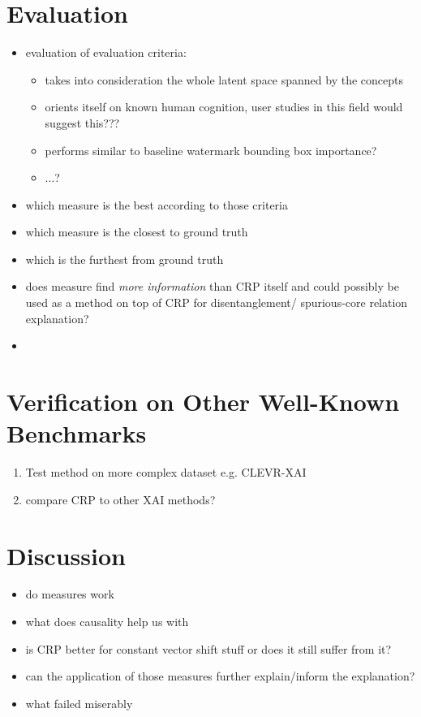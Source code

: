 \section{Evaluation}
\begin{itemize}
    \item evaluation of evaluation criteria:
    \begin{itemize}
        \item takes into consideration the whole latent space spanned by the concepts
        \item orients itself on known human cognition, user studies in this field would suggest this??? 
        \item performs similar to baseline watermark bounding box importance? 
        \item ...? 
    \end{itemize}
    \item which measure is the best according to those criteria
    \item which measure is the closest to ground truth
    \item which is the furthest from ground truth
    \item does measure find \textit{more information} than CRP itself and could possibly be used as a method on top of CRP for disentanglement/ spurious-core relation explanation?
    \item 
\end{itemize}

\section{Verification on Other Well-Known Benchmarks}
\begin{enumerate}
    \item Test method on more complex dataset e.g. CLEVR-XAI
    \item compare CRP to other XAI methods?
\end{enumerate}

\section{Discussion}
\begin{itemize}
    \item do measures work
    \item what does causality help us with
    \item is CRP better for constant vector shift stuff or does it still suffer from it?
    \item can the application of those measures further explain/inform the explanation?
    \item what failed miserably
\end{itemize}
